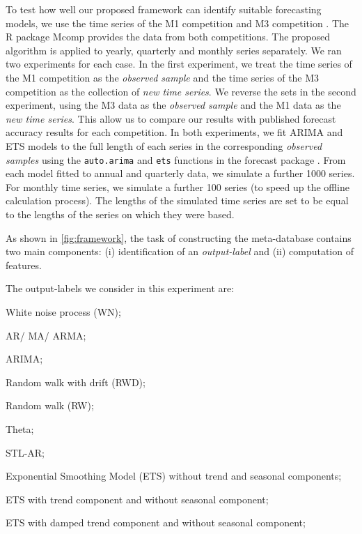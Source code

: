 \documentclass[11pt,a4paper,]{article}
\theoremstyle{definition}
\theoremstyle{definition}
\theoremstyle{definition}
\theoremstyle{remark}
\begin{document}
To test how well our proposed framework can identify suitable
forecasting models, we use the time series of the M1 competition
\autocite{makridakis1982accuracy} and M3 competition
\autocite{makridakis2000m3}. The R package Mcomp \autocite{hyndmanmcomp}
provides the data from both competitions. The proposed algorithm is
applied to yearly, quarterly and monthly series separately. We ran two
experiments for each case. In the first experiment, we treat the time
series of the M1 competition as the \emph{observed sample} and the time
series of the M3 competition as the collection of \emph{new time
series}. We reverse the sets in the second experiment, using the M3 data
as the \emph{observed sample} and the M1 data as the \emph{new time
series}. This allow us to compare our results with published forecast
accuracy results for each competition. In both experiments, we fit ARIMA
and ETS models to the full length of each series in the corresponding
\emph{observed samples} using the \texttt{auto.arima} and \texttt{ets}
functions in the forecast package \autocite{Hyndman2008}. From each
model fitted to annual and quarterly data, we simulate a further 1000
series. For monthly time series, we simulate a further 100 series (to
speed up the offline calculation process). The lengths of the simulated
time series are set to be equal to the lengths of the series on which
they were based.

As shown in \autoref{fig:framework}, the task of constructing the
meta-database contains two main components: (i) identification of an
\emph{output-label} and (ii) computation of features.

The output-labels we consider in this experiment are:

\begin{compactenum}[\hspace*{1cm}(a)]
  \item White noise process (WN);
  \item AR/ MA/ ARMA;
  \item ARIMA;
  \item Random walk with drift (RWD);
  \item Random walk (RW);
  \item Theta;
  \item STL-AR;
  \item Exponential Smoothing Model (ETS) without trend and seasonal components;
  \item ETS with trend component and without seasonal component;
  \item ETS with damped trend component and without seasonal component;
  \end{compactenum}
\end{document}
